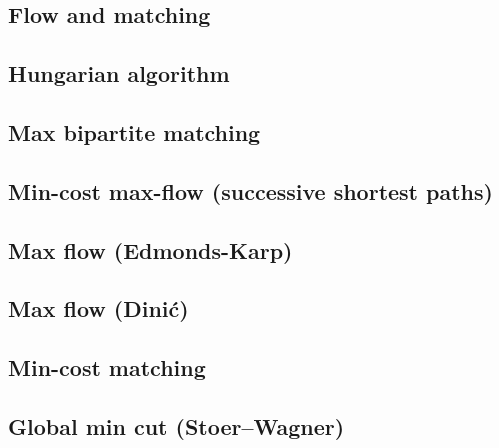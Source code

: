 \documentclass[9pt]{extarticle}
\begin{document}
\begin{multicols*}{3}
\setlength{\parskip}{0.0in}
\tableofcontents
\setlength{\parskip}{0.1in}
\section{Flow and matching}

\subsection{Hungarian algorithm} %


\subsection{Max bipartite matching} %


\subsection{Min-cost max-flow (successive shortest paths)}


\subsection{Max flow (Edmonds-Karp)}


\subsection{Max flow (Dini\'c)} %


\subsection{Min-cost matching} %


\subsection{Global min cut (Stoer--Wagner)} %



\end{multicols*}
\end{document}
